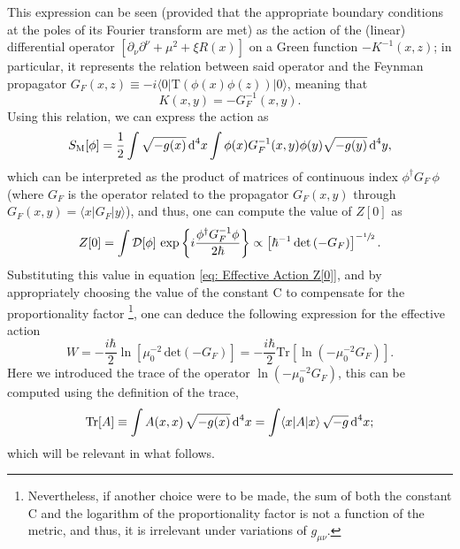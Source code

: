 This expression can be seen (provided that the appropriate boundary conditions at the poles of its Fourier transform are met) as the action of the (linear) differential operator $\left[\partial_\nu\partial^\nu+\mu^2+\xi R(x)\right]$ on a Green function $-K^{-1}(x,z)$; in particular, it represents the relation between said operator and the Feynman propagator $G_F(x,z)\equiv -i\langle 0|\text{T}\left(\phi(x)\phi(z)\right)|0\rangle$, meaning that
\begin{equation}
	K(x,y)=-G_F^{-1}(x,y).
\end{equation}
Using this relation, we can express the action as
\begin{equation}
	S_\text{M}[\phi]=\frac{1}{2}\int\sqrt{-g(x)}\,\text{d}^4x\int\phi(x)G_F^{-1}(x,y)\phi(y)\sqrt{-g(y)}\,\text{d}^4 y,
\end{equation}
which can be interpreted as the product of matrices of continuous index $\phi^\dagger G_F\,\phi$ (where $G_F$ is the operator related to the propagator $G_F(x,y)$ through $G_F(x,y)=\langle x|G_F|y\rangle$), and thus, one can compute the value of $Z[0]$ as
\begin{equation}
	Z[0]=\int\mathcal{D}[\phi]\,\exp{\left\{i\frac{\phi^\dagger G_F^{-1}\phi}{2\hbar}\right\}}\propto\left[\hbar^{-1}\,\text{det}\left(-G_F\right)\right]^{-\sfrac{1}{2}}.
\end{equation}
Substituting this value in equation \ref{eq: Effective Action Z[0]}, and by appropriately choosing the value of the constant C to compensate for the proportionality factor \footnote{Nevertheless, if another choice were to be made, the sum of both the constant C and the logarithm of the proportionality factor is not a function of the metric, and thus, it is irrelevant under variations of $g_{\mu\nu}$.}, one can deduce the following expression for the effective action
\begin{equation}\label{eq: Effective action W propagator}
	W=-\frac{i\hbar}{2}\ln\left[\mu_0^{-2} \,\text{det}\left(-G_F\right)\right]=-\frac{i\hbar}{2}\text{Tr}\left[\ln\left(-\mu_0^{-2}G_F\right)\right].
\end{equation}
Here we introduced the trace of the operator $\ln\left(-\mu_0^{-2}G_F\right)$, this can be computed using the definition of the trace,
\begin{equation}\label{eq: Trace definition}
	\text{Tr}[A]\equiv \int A(x,x)\,\sqrt{-g(x)}\,\text{d}^4x=\int \langle x|A|x\rangle\,\sqrt{-g}\,\text{d}^4x;
\end{equation}
which will be relevant in what follows.
